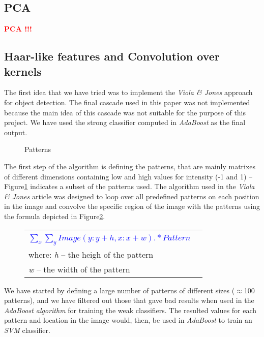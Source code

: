 \documentclass[11pt,twocolumn]{article}
\newcommand{\todo}[1]{\textcolor{red}{\textbf{#1}}}
\begin{document}
	\subsection{PCA}\label{sec:PCA}
		\todo{\hspace*{10px}PCA !!!}
				
	\subsection{Haar-like features and Convolution over kernels}\label{sec:Haar}
	\hspace*{10px}The first idea that we have tried was to implement the
	\emph{Viola \& Jones} approach for object detection. The final cascade used in
	this paper was not implemented because the main idea of this cascade was not
	suitable for the purpose of this project. We have used the strong classifier
	computed in \emph{AdaBoost} as the final output.\\ 
	\begin{figure}[!hbtp]
		\caption{Patterns}
		\label{patterns}
	\end{figure}
	\hspace*{10px}The first step of the algorithm is defining the patterns, that
	are mainly matrixes of different dimensions containing low and high values
	for intensity (-1 and 1) -- Figure\ref{patterns} indicates a subset of the
	patterns used. The algorithm used in the \emph{Viola \& Jones} article was
	designed to loop over all predefined patterns on each position in the image
	and convolve the specific region of the image with the patterns using the
	formula depicted in Figure\ref{patterns_formula}.\\
	\begin{figure}
		\selectfont\small
		\caption{}
		\begin{tabular}{|lr|} \hline
			& \\[5pt]
			\textcolor{blue}{$\sum_x\sum_y Image(y:y+h,x:x+w) .* Pattern$} &\\[10pt]
			where: \emph{h} -- the heigh of the pattern &\\
			\hspace*{28px} \emph{w} -- the width of the pattern &\\[5pt] 
			\hline 
		\end{tabular}
		\label{patterns_formula}
	\end{figure}
\hspace*{10px}We have started by defining a large number of patterns of different sizes ($\approx$100 patterns), and we have filtered out those that gave bad results when used in the \emph{AdaBoost algorithm} for training the weak classifiers. The resulted values for each pattern and location in the image would, then, be used in \emph{AdaBoost} to train an \emph{SVM} classifier.\\
\end{document}
